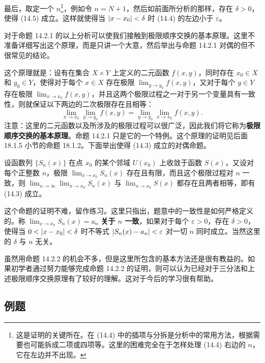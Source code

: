 最后，取定一个 $n$\footnote{这是证明的关键所在。在 (14.4) 中的插项与分拆是分析中的常用方法，根据需要也可能拆成二项或四项等。这里的困难完全在于怎样处理 (14.4) 右边的 $n$，它在左边并不出现。}，例如令 $n=N+1$，然后如前面所分析的那样，存在 $\delta>0$，使得 (14.5) 成立。这样就使得当 $\lvert x-x_0\rvert<\delta$ 时 (14.4) 的左边小于 $\varepsilon$。

\begin{xremark}
对于命题 14.2.1 的以上分析可以使我们接触到极限顺序交换的基本原理。这里不准备详细写出这个原理，而是只讲一个大意，然后举出与命题 14.2.1 对偶的但不很常见的结论。
\end{xremark}

这个原理就是：设有在集合 $X\times Y$ 上定义的二元函数 $f(x,y)$，同时存在 $x_0\in X$ 和 $y_0\in Y$，使得对于每个 $x\in X$ 存在极限 $\displaystyle\lim_{y\to y_0}f(x,y)$，又对于每个 $y\in Y$ 存在极限 $\displaystyle\lim_{x\to x_0}f(x,y)$，并且这两个极限过程之一对于另一个变量具有一致性，则就保证以下两边的二次极限存在且相等：
\[
  \lim_{x\to x_0}\lim_{y\to y_0}f(x,y)=\lim_{y\to y_0}\lim_{x\to x_0}f(x,y).
\]
注意：这里的二元函数以及所涉及的极限过程可以很广泛，因此我们将它称为\textbf{极限顺序交换的基本原理}。命题 14.2.1 只是它的一个特例。这个原理的证明见后面 18.1.5 小节的命题 18.1.2。下面举出使得 (14.3) 成立的对偶命题。

\begin{xproposition}[14.2.2]
设函数列 $\{S_n(x)\}$ 在点 $x_0$ 的某个邻域 $U(x_0)$ 上收敛于函数 $S(x)$，又设对每个正整数 $n$，极限 $\displaystyle\lim_{x\to x_0}S_n(x)$ 存在且有限，而且这个极限过程对 $n$ 一致，则 $\displaystyle\lim_{n\to\infty}\lim_{x\to x_0}S_n(x)$ 与 $\displaystyle\lim_{x\to x_0}S(x)$ 都存在且两者相等，即有 (14.3) 成立。
\end{xproposition}

这个命题的证明不难，留作练习。这里只指出，题意中的一致性是如何严格定义的。称 $\displaystyle\lim_{x\to x_0}S_n(x)=a_n$ \textbf{关于 $n$ 一致}，如果对于每个 $\varepsilon>0$，存在 $\delta>0$，使得当 $0<\lvert x-x_0\rvert<\delta$ 时不等式 $\lvert S_n(x)-a_n\rvert<\varepsilon$ 对一切 $n$ 同时成立。当然这里的 $\delta$ 与 $n$ 无关。

虽然用命题 14.2.2 的机会不多，但是这里所包含的基本方法还是很有教益的。如果初学者通过努力能够完成命题 14.2.2 的证明，则可以认为已经对于三分法和上述极限顺序交换原理有了较好的理解。这对于今后的学习很有帮助。

\subsection{例题}

